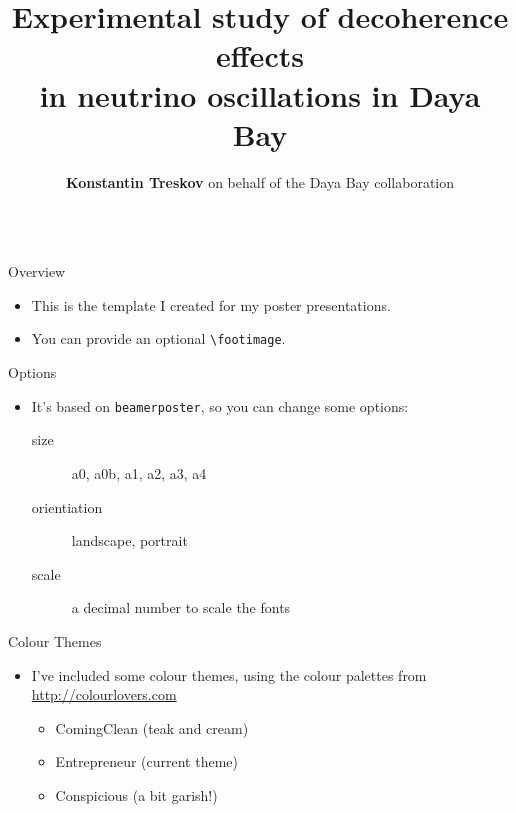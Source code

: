 \documentclass[usenames, dvipsnames]{beamer}
\author[]{\textbf{Konstantin Treskov} on behalf of the Daya Bay collaboration}
\title{Experimental study of decoherence effects\\ in neutrino oscillations in
Daya Bay}
\institute{Joint Institute for Nuclear Research, Dubna, Russia}
\begin{document}
\begin{frame}[fragile]
\begin{columns}[T]

\begin{column}{.33\textwidth}

\begin{block}{Overview}
\begin{itemize}
\item This is the template I created for my poster presentations.
\item You can provide an optional \verb|\footimage|.
\end{itemize}
\end{block}

\begin{block}{Options}
\begin{itemize}
\item It's based on \texttt{beamerposter}, so you can change some options:
  \begin{description}
  \item[size] a0, a0b, a1, a2, a3, a4
  \item[orientiation] landscape, portrait
  \item[scale] a decimal number to scale the fonts
  \end{description}
\end{itemize}
\end{block}

\begin{block}{Colour Themes}
\begin{itemize}
\item I've included some colour themes, using the colour palettes from \url{http://colourlovers.com}
\begin{itemize}
\item ComingClean (teak and cream)
\item Entrepreneur (current theme)
\item Conspicious (a bit garish!)
\end{itemize}
\end{itemize}
\end{block}

\end{column}

\begin{column}{.3\textwidth}


\end{column}
\end{columns}
\end{frame}
\end{document}
